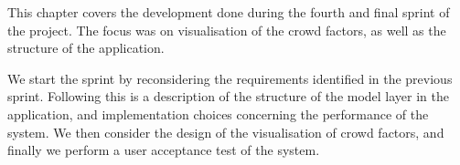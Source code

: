This chapter covers the development done during the fourth and final sprint of the project. The focus was on visualisation of the crowd factors, as well as the structure of the application.

We start the sprint by reconsidering the requirements identified in the previous sprint. Following this is a description of the structure of the model layer in the application, and implementation choices concerning the performance of the system. We then consider the design of the visualisation of crowd factors, and finally we perform a user acceptance test of the system.